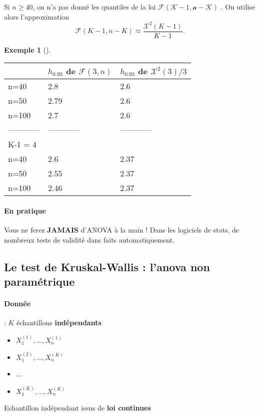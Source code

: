 \documentclass{article}
\theoremstyle{plain}%
\theoremstyle{definition}
\newtheorem{exmp}{Exemple}[section]
\theoremstyle{remark}
\begin{document}
Si $ n \geq 40 $, on n'a pas donné les quantiles de la loi $ \mathcal{F(K-1, n-K)} $ . On utilise alors l'approximation 
\[
    \mathcal{F}(K-1, n-K) \approx \frac{\mathcal{X}^2(K-1)}{K-1}
.\]

\begin{exmp}[]
    \begin{table}[!ht]
        \centering
        \begin{tabular}{|l|l|l|}
        \hline
            & $ h_{0.95} $ de $\mathcal{F}(3,n)$ & $ h_{0.95}$ de $\mathcal{X}^2(3)/3$ \\ \hline
            n=40 & 2.8 & 2.6 \\ \hline
            n=50 & 2.79 & 2.6 \\ \hline
            n=100 & 2.7 & 2.6 \\ \hline
            ------------ & ------------ & ------------ \\ \hline
            K-1 = 4 & ~ & ~ \\ \hline
            n=40 & 2.6 & 2.37 \\ \hline
            n=50 & 2.55 & 2.37 \\ \hline
            n=100 & 2.46 & 2.37 \\ \hline
        \end{tabular}
    \end{table}
\end{exmp}

\paragraph*{En pratique} 
Vous ne ferez \textbf{JAMAIS} d'ANOVA à la main ! Dans les logiciels de stats, de nombreux tests de validité dans faits automatiquement.

\subsection{Le test de Kruskal-Wallis : l'anova non paramétrique}
\paragraph*{Donnée} : $ K $ échantillons \textbf{indépendants} \begin{itemize}
    \item $ X_1^{(1)}, \dots, X_n^{(1)} $ 
    \item $ X_1^{(2)}, \dots, X_n^{(K)} $ 
    \item ...
    \item $ X_1^{(K)}, \dots, X_n^{(K)} $ 
\end{itemize}
Echantillon indépendant issus de \textbf{loi continues}
\end{document}
